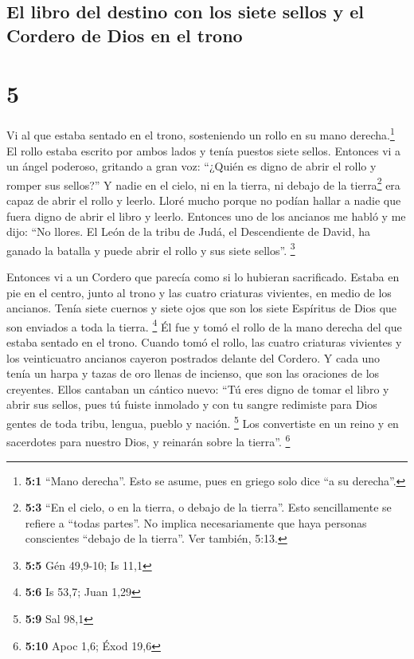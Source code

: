 \hypertarget{el-libro-del-destino-con-los-siete-sellos-y-el-cordero-de-dios-en-el-trono}{%
\subsection{El libro del destino con los siete sellos y el Cordero de
Dios en el
trono}\label{el-libro-del-destino-con-los-siete-sellos-y-el-cordero-de-dios-en-el-trono}}

\hypertarget{section-4}{%
\section{5}\label{section-4}}

 Vi al que estaba sentado en el trono, sosteniendo un
rollo en su mano derecha.\footnote{\textbf{5:1} ``Mano derecha''. Esto
  se asume, pues en griego solo dice ``a su derecha''.} El rollo estaba
escrito por ambos lados y tenía puestos siete sellos. 
Entonces vi a un ángel poderoso, gritando a gran voz: ``¿Quién es digno
de abrir el rollo y romper sus sellos?''  Y nadie en el
cielo, ni en la tierra, ni debajo de la tierra\footnote{\textbf{5:3}
  ``En el cielo, o en la tierra, o debajo de la tierra''. Esto
  sencillamente se refiere a ``todas partes''. No implica necesariamente
  que haya personas conscientes ``debajo de la tierra''. Ver también,
  5:13.} era capaz de abrir el rollo y leerlo.  Lloré
mucho porque no podían hallar a nadie que fuera digno de abrir el libro
y leerlo.  Entonces uno de los ancianos me habló y me
dijo: ``No llores. El León de la tribu de Judá, el Descendiente de
David, ha ganado la batalla y puede abrir el rollo y sus siete sellos''.
\footnote{\textbf{5:5} Gén 49,9-10; Is 11,1}

 Entonces vi a un Cordero que parecía como si lo hubieran
sacrificado. Estaba en pie en el centro, junto al trono y las cuatro
criaturas vivientes, en medio de los ancianos. Tenía siete cuernos y
siete ojos que son los siete Espíritus de Dios que son enviados a toda
la tierra. \footnote{\textbf{5:6} Is 53,7; Juan 1,29}  Él
fue y tomó el rollo de la mano derecha del que estaba sentado en el
trono.  Cuando tomó el rollo, las cuatro criaturas
vivientes y los veinticuatro ancianos cayeron postrados delante del
Cordero. Y cada uno tenía un harpa y tazas de oro llenas de incienso,
que son las oraciones de los creyentes.  Ellos cantaban un
cántico nuevo: ``Tú eres digno de tomar el libro y abrir sus sellos,
pues tú fuiste inmolado y con tu sangre redimiste para Dios gentes de
toda tribu, lengua, pueblo y nación. \footnote{\textbf{5:9} Sal 98,1}
 Los convertiste en un reino y en sacerdotes para nuestro
Dios, y reinarán sobre la tierra''. \footnote{\textbf{5:10} Apoc 1,6;
  Éxod 19,6}

